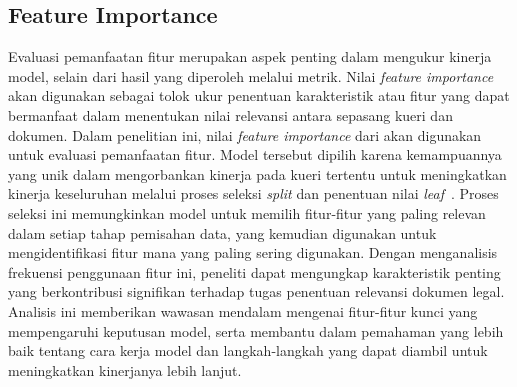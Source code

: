 \subsection{Feature Importance}
\label{subbab:3:Feature Importance}
Evaluasi pemanfaatan fitur merupakan aspek penting dalam mengukur kinerja model, selain dari hasil yang diperoleh melalui metrik. Nilai \textit{feature importance} akan digunakan sebagai tolok ukur penentuan karakteristik atau fitur yang dapat bermanfaat dalam menentukan nilai relevansi antara sepasang kueri dan dokumen. Dalam penelitian ini, nilai \textit{feature importance} dari \lambdamart{} akan digunakan untuk evaluasi pemanfaatan fitur. Model \reranker{} tersebut dipilih karena kemampuannya yang unik dalam mengorbankan kinerja pada kueri tertentu untuk meningkatkan kinerja keseluruhan melalui proses seleksi \textit{split} dan penentuan nilai \textit{leaf}~\citep{burges2010ranknet}. Proses seleksi ini memungkinkan model untuk memilih fitur-fitur yang paling relevan dalam setiap tahap pemisahan data, yang kemudian digunakan untuk mengidentifikasi fitur mana yang paling sering digunakan. Dengan menganalisis frekuensi penggunaan fitur ini, peneliti dapat mengungkap karakteristik penting yang berkontribusi signifikan terhadap tugas penentuan relevansi dokumen legal. Analisis ini memberikan wawasan mendalam mengenai fitur-fitur kunci yang mempengaruhi keputusan model, serta membantu dalam pemahaman yang lebih baik tentang cara kerja model dan langkah-langkah yang dapat diambil untuk meningkatkan kinerjanya lebih lanjut.







